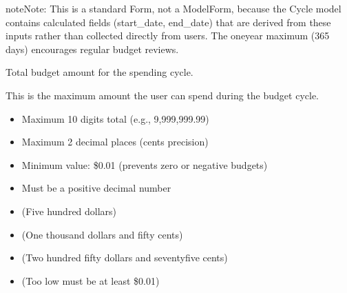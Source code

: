 \documentclass[letterpaper,10pt,english]{sphinxmanual}
\begin{document}
\begin{fulllineitems}
\begin{sphinxadmonition}{note}{Note:}
\sphinxAtStartPar
This is a standard Form, not a ModelForm, because the Cycle model
contains calculated fields (start\_date, end\_date) that are derived
from these inputs rather than collected directly from users.
The one\sphinxhyphen{}year maximum (365 days) encourages regular budget reviews.
\end{sphinxadmonition}

\begin{fulllineitems}
\label{\detokenize{expensesApp:expensesApp.froms.CycleForm.total_allowance}}
\pysigstartsignatures
\pysigline
{}
\pysigstopsignatures
\sphinxAtStartPar
Total budget amount for the spending cycle.

\sphinxAtStartPar
This is the maximum amount the user can spend during the budget cycle.
\begin{description}
\begin{itemize}
\item {} 
\sphinxAtStartPar
Maximum 10 digits total (e.g., 9,999,999.99)

\item {} 
\sphinxAtStartPar
Maximum 2 decimal places (cents precision)

\item {} 
\sphinxAtStartPar
Minimum value: \$0.01 (prevents zero or negative budgets)

\item {} 
\sphinxAtStartPar
Must be a positive decimal number

\end{itemize}

\begin{itemize}
\item {} 
 (Five hundred dollars)

\item {} 
 (One thousand dollars and fifty cents)

\item {} 
 (Two hundred fifty dollars and seventy\sphinxhyphen{}five cents)

\end{itemize}

\begin{itemize}
\item {} 
 (Too low \sphinxhyphen{} must be at least \$0.01)


\end{itemize}
\end{description}
\end{fulllineitems}
\end{fulllineitems}
\end{document}
